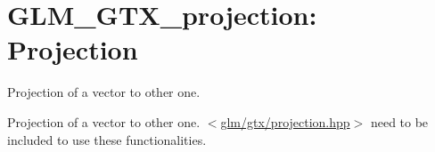 \hypertarget{group__gtx__projection}{\section{\-G\-L\-M\-\_\-\-G\-T\-X\-\_\-projection\-: \-Projection}
\label{group__gtx__projection}
}


\-Projection of a vector to other one.  


\-Projection of a vector to other one. $<$\hyperlink{projection_8hpp}{glm/gtx/projection.\-hpp}$>$ need to be included to use these functionalities. 